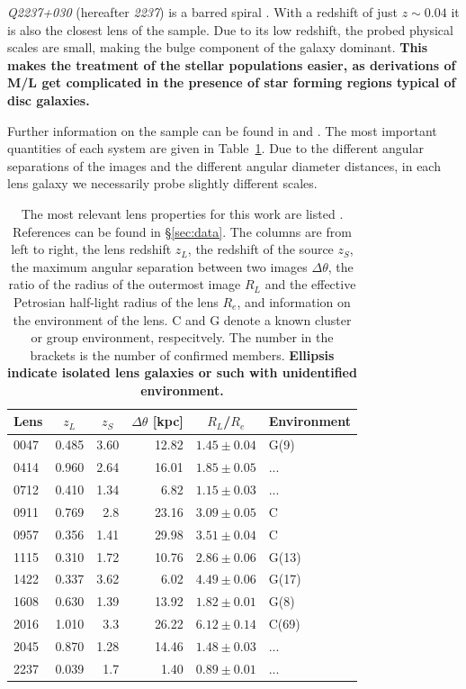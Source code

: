 \documentclass[useAMS,usenatbib]{mn2e}
\newcommand{\cb}[1]{{\color{red} \textbf{#1}}}
\begin{document}
\textit{Q2237+030} (hereafter \textit{2237}) is a barred spiral \citep{1988AJ.....95.1331Y}. With a redshift of just \cb{$z\sim0.04$} it is also the closest lens of the sample. Due to its low redshift, the probed physical scales are small, making the bulge component of the galaxy dominant. \cb{This makes the treatment of the stellar populations easier, as derivations of M/L get complicated in the presence of star forming regions typical of disc galaxies.}

Further information on the sample can be found in \citet{2011ApJ...740...97L} and \citet{2012A&A...538A..99S}. The most important quantities of each system are given in Table~\ref{tab:lensproperties}. Due to the different angular separations of the images and the different angular diameter distances, in each lens galaxy we necessarily probe slightly different scales.

\begin{table}
  \begin{center}
    \begin{tabular}{l r r r r l}
      Lens    & \multicolumn{1}{c}{$z_{L}$} & \multicolumn{1}{c}{$z_{S}$} & \multicolumn{1}{c}{$\Delta\theta$ [kpc]} & \multicolumn{1}{c}{$R_{L}$/$R_{e}$} & Environment \\ \hline
      0047 & 0.485 & 3.60 & 12.82 & $1.45\pm0.04$ & G(9) \\
      0414 & 0.960 & 2.64 & 16.01 & $1.85\pm0.05$ & ... \\
      0712 & 0.410 & 1.34 & 6.82  & $1.15\pm0.03$ & ... \\
      0911 & 0.769 & 2.8  & 23.16 & $3.09\pm0.05$ & C \\
      0957 & 0.356 & 1.41 & 29.98 & $3.51\pm0.04$ & C \\
      1115 & 0.310 & 1.72 & 10.76 & $2.86\pm0.06$ & G(13) \\
      1422 & 0.337 & 3.62 & 6.02  & $4.49\pm0.06$ & G(17) \\
      1608 & 0.630 & 1.39 & 13.92 & $1.82\pm0.01$ & G(8) \\
      2016 & 1.010 & 3.3  & 26.22 & $6.12\pm0.14$ & C(69) \\
      2045 & 0.870 & 1.28 & 14.46 & $1.48\pm0.03$ & ... \\
      2237 & 0.039 & 1.7  & 1.40  & $0.89\pm0.01$ & ... \\
    \end{tabular}
    \caption[width=\linewidth]{The most relevant lens properties for this work are listed \citep[for an expanded version of this table see][]{2011ApJ...740...97L}. References can be found in \S\ref{sec:data}. The columns are from left to right, the lens redshift $z_L$, the redshift of the source $z_S$, the maximum angular separation between two images $\Delta\theta$, the ratio of the radius of the outermost image $R_L$ and the effective Petrosian half-light radius of the lens $R_e$, and information on the environment of the lens. C and G denote a known cluster or group environment, respecitvely. The number in the brackets is the number of confirmed members. \cb{Ellipsis indicate isolated lens galaxies or such with unidentified environment.}}
    \label{tab:lensproperties}
  \end{center}
\end{table}
\end{document}
